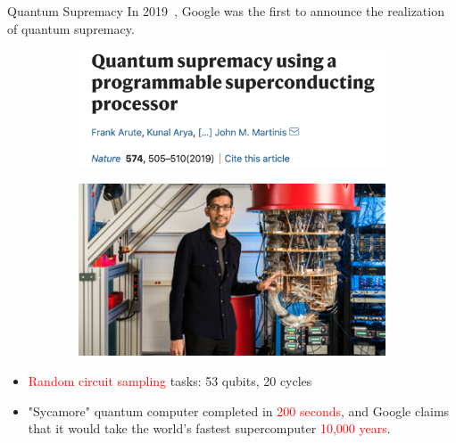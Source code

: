 \documentclass[10pt]{beamer}
\begin{document}
\begin{CJK}{UTF8}{gbsn}
\begin{frame}[fragile]{Quantum Supremacy}
 In 2019~, Google was the first to announce the realization of quantum supremacy.
  \begin{figure}
    \centering
    \begin{subfigure}[b]{0.45\textwidth}
      \includegraphics[width=\textwidth]{fig/supremacy1.png}
    \end{subfigure}
    \hfill
    \begin{subfigure}[b]{0.4\textwidth}
      \includegraphics[width=\textwidth]{fig/supremacy2.png}
    \end{subfigure}
  \end{figure}
  \begin{itemize}
    \item \textcolor{red}{Random circuit sampling}  tasks: 53 qubits, 20 cycles
    \item "Sycamore" quantum computer completed in \textcolor{red}{200 seconds}, and Google claims that it would take the world’s fastest supercomputer \textcolor{red}{10,000 years}.
  \end{itemize}
  \vspace{2em}
\end{frame}
\end{CJK}
\end{document}
